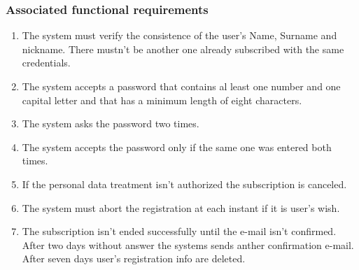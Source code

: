 \subsubsection{Associated functional requirements}
\begin{enumerate}
\item The system must verify the consistence of the user's Name, Surname and nickname. There mustn't be another one already subscribed with the same credentials.
\item The system accepts a password that contains al least one number and one capital letter and that has a minimum length of eight characters.
\item The system asks the password two times.
\item The system accepts the password only if the same one was entered both times.
\item If the personal data treatment isn't authorized the subscription is canceled.
\item The system must abort the registration at each instant if it is user's wish.
\item The subscription isn't ended successfully until the e-mail isn't confirmed. After two days without answer the systems sends anther confirmation e-mail. After seven days user's registration info are deleted.
\end{enumerate}

